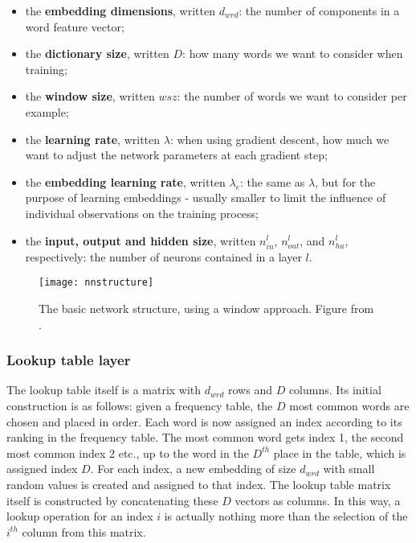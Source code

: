 \begin{itemize}
\item the \textbf{embedding dimensions}, written $d_{wrd}$: the number of
  components in a word feature vector;
\item the \textbf{dictionary size}, written $D$: how many words we want to consider
  when training;
\item the \textbf{window size}, written $wsz$: the number of words we want to
  consider per example;
\item the \textbf{learning rate}, written $\lambda$: when using gradient descent,
  how much we want to adjust the network parameters at each gradient
  step;
\item the \textbf{embedding learning rate}, written $\lambda_{e}$: the same as
  $\lambda$, but for the purpose of learning embeddings - usually
  smaller to limit the influence of individual observations on the
  training process;
\item the \textbf{input, output and hidden size}, written $n^l_{in}$, $n^l_{out}$, and $n^l_{hu}$, respectively: the number of neurons
  contained in a layer $l$.
\end{itemize}

\begin{figure}
  \texttt{[image: nnstructure]}
  \caption{The basic network structure, using a window approach. Figure from \cite[2499]{collobert-2011}.} \label{fig:nnstructure}
\end{figure}

\subsubsection{Lookup table layer}
The lookup table itself is a matrix with $d_{wrd}$ rows and $D$
columns. Its initial construction is as follows: given a frequency
table, the $D$ most common words are chosen and placed in order. Each
word is now assigned an index according to its ranking in the
frequency table. The most common word gets index 1, the second most
common index 2 etc., up to the word in the $D^{th}$ place in the
table, which is assigned index $D$. For each index, a new embedding of
size $d_{wrd}$ with small random values is created and assigned to
that index. The lookup table matrix itself is constructed by
concatenating these $D$ vectors as columns.  In this way, a lookup
operation for an index $i$ is actually nothing more than the selection
of the $i^{th}$ column from this matrix.

